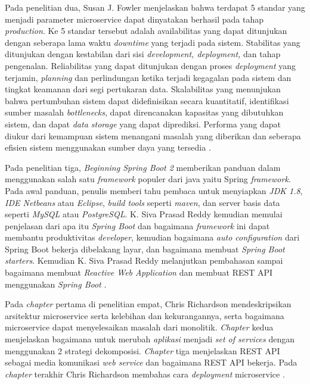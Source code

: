 Pada penelitian dua, Susan J. Fowler menjelaskan bahwa terdapat 5 standar yang menjadi parameter microservice dapat dinyatakan berhasil pada tahap \textit{production}. Ke 5 standar tersebut adalah availabilitas yang dapat ditunjukan dengan seberapa lama waktu \textit{downtime} yang terjadi pada sistem. Stabilitas yang ditunjukan dengan kestabilan dari sisi \textit{development, deployment,} dan tahap pengenalan. Reliabilitas yang dapat ditunjukan dengan proses \textit{deployment} yang terjamin, \textit{planning} dan perlindungan ketika terjadi kegagalan pada sistem dan tingkat keamanan dari segi pertukaran data. Skalabilitas yang menunjukan bahwa pertumbuhan sistem dapat didefinisikan secara kuantitatif, identifikasi sumber masalah \textit{bottlenecks}, dapat direncanakan kapasitas yang dibutuhkan sistem, dan dapat \textit{data storage} yang dapat diprediksi. Performa yang dapat diukur dari kemampuan sistem menangani masalah yang diberikan dan seberapa efisien sistem menggunakan sumber daya yang tersedia \cite{10}.

Pada penelitian tiga, \textit{Beginning Spring Boot 2} memberikan panduan dalam menggunakan salah satu \textit{framework} populer dari java yaitu Spring \textit{framework}. Pada awal panduan, penulis memberi tahu pembaca untuk menyiapkan \textit{JDK 1.8}, \textit{IDE Netbeans} atau \textit{Eclipse}, \textit{build tools} seperti \textit{maven}, dan server basis data seperti \textit{MySQL} atau \textit{PostgreSQL}. K. Siva Prasad Reddy kemudian memulai penjelasan dari apa itu \textit{Spring Boot} dan bagaimana \textit{framework} ini dapat membantu produktivitas \textit{developer}, kemudian bagaimana \textit{auto configuration} dari Spring Boot bekerja dibelakang layar, dan bagaimana membuat \textit{Spring Boot starters}. Kemudian K. Siva Prasad Reddy melanjutkan pembahasan sampai bagaimana membuat \textit{Reactive Web Application} dan membuat REST API menggunakan \textit{Spring Boot} \cite{11}.

Pada \textit{chapter} pertama di penelitian empat, Chris Richardson mendeskripsikan arsitektur microservice serta kelebihan dan kekurangannya, serta bagaimana microservice dapat menyelesaikan masalah dari monolitik. \textit{Chapter} kedua menjelaskan bagaimana untuk merubah \textit{aplikasi} menjadi \textit{set of services} dengan menggunakan 2 strategi dekomposisi. \textit{Chapter} tiga menjelaskan REST API sebagai media komunikasi \textit{web service} dan bagaimana REST API bekerja. Pada \textit{chapter} terakhir Chris Richardson membahas cara \textit{deployment} microservice \cite{13}.

